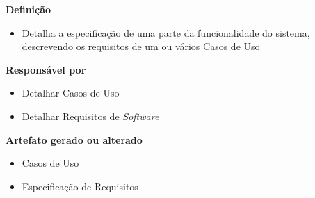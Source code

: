 \textbf{Definição}
\begin{itemize}
\item Detalha a especificação de uma parte da funcionalidade do sistema, descrevendo os requisitos de um ou vários Casos de Uso 
\end{itemize}

\textbf{Responsável por}
\begin{itemize}
\item Detalhar Casos de Uso
\item Detalhar Requisitos de \textit{Software}
\end{itemize}

\textbf{Artefato gerado ou alterado}
\begin{itemize}
\item Casos de Uso
\item Especificação de Requisitos
\end{itemize}
